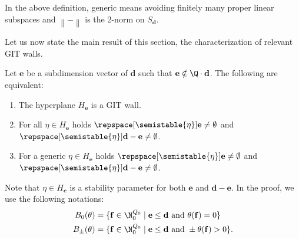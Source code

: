 \documentclass[11pt, a4paper]{amsart}
\begin{document}
	In the above definition, generic means avoiding finitely many proper linear subspaces and $\left\|-\right\|$ is the 2-norm on $S_\mathbf{d}$.
	
	Let us now state the main result of this section, the characterization of relevant GIT walls.
	
	\begin{thm}
		Let $\mathbf{e}$ be a subdimension vector of $\mathbf{d}$ such that $\mathbf{e} \notin \Q\cdot \mathbf{d}$. The following are equivalent:
		\begin{enumerate}
			\item\label{wall} The hyperplane $H_\mathbf{e}$ is a GIT wall.
			\item\label{all} For all $\eta \in H_\mathbf{e}$ holds $\repspace[\semistable{\eta}]{\mathbf{e}} \neq \emptyset$ and $\repspace[\semistable{\eta}]{\mathbf{d}-\mathbf{e}} \neq \emptyset$.
			\item\label{generic} For a generic $\eta \in H_\mathbf{e}$ holds $\repspace[\semistable{\eta}]{\mathbf{e}} \neq \emptyset$ and $\repspace[\semistable{\eta}]{\mathbf{d}-\mathbf{e}} \neq \emptyset$.
		\end{enumerate}
	\end{thm}

	Note that $\eta \in H_\mathbf{e}$ is a stability parameter for both $\mathbf{e}$ and $\mathbf{d}-\mathbf{e}$. In the proof, we use the following notations:
	\begin{align*}
		B_0(\theta) &= \{ \mathbf{f} \in \N_0^{Q_0} \mid \mathbf{e} \leq \mathbf{d} \text{ and } \theta(\mathbf{f}) = 0 \} \\
		B_\pm(\theta) &= \{ \mathbf{f} \in \N_0^{Q_0} \mid \mathbf{e} \leq \mathbf{d} \text{ and } \pm\theta(\mathbf{f}) > 0 \}.
	\end{align*}
		
\end{document}

